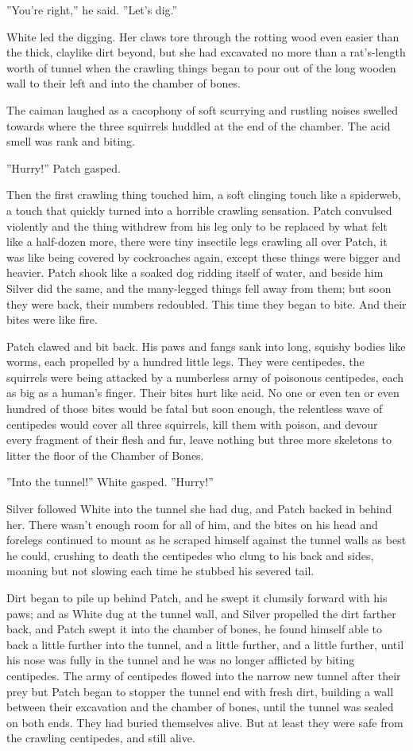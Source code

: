\documentclass[12pt]{book}
\begin{document}
''You're right,'' he said. ''Let's dig.''

White led the digging. Her claws tore through the rotting wood even easier than the thick, claylike dirt beyond, but she had excavated no more than a rat's-length worth of tunnel when the crawling things began to pour out of the long wooden wall to their left and into the chamber of bones.

The caiman laughed as a cacophony of soft scurrying and rustling noises swelled towards where the three squirrels huddled at the end of the chamber. The acid smell was rank and biting.

''Hurry!'' Patch gasped.

Then the first crawling thing touched him, a soft clinging touch like a spiderweb, a touch that quickly turned into a horrible crawling sensation. Patch convulsed violently and the thing withdrew from his leg %
only to be replaced by what felt like a half-dozen more, there were tiny insectile legs crawling all over Patch, it was like being covered by cockroaches again, except these things were bigger and heavier. Patch shook like a soaked dog ridding itself of water, and beside him Silver did the same, and the many-legged things fell away from them; but soon they were back, their numbers redoubled. This time they began to bite. And their bites were like fire.

Patch clawed and bit back. His paws and fangs sank into long, squishy bodies like worms, each propelled by a hundred little legs. They were centipedes, the squirrels were being attacked by a numberless army of poisonous centipedes, each as big as a human's finger. Their bites hurt like acid. No one or even ten or even hundred of those bites would be fatal %
but soon enough, the relentless wave of centipedes would cover all three squirrels, kill them with poison, and devour every fragment of their flesh and fur, leave nothing but three more skeletons to litter the floor of the Chamber of Bones.

''Into the tunnel!'' White gasped. ''Hurry!''

Silver followed White into the tunnel she had dug, and Patch backed in behind her. There wasn't enough room for all of him, and the bites on his head and forelegs continued to mount as he scraped himself against the tunnel walls as best he could, crushing to death the centipedes who clung to his back and sides, moaning but not slowing each time he stubbed his severed tail.

Dirt began to pile up behind Patch, and he swept it clumsily forward with his paws; and as White dug at the tunnel wall, and Silver propelled the dirt farther back, and Patch swept it into the chamber of bones, he found himself able to back a little further into the tunnel, and a little further, and a little further, until his nose was fully in the tunnel and he was no longer afflicted by biting centipedes. The army of centipedes flowed into the narrow new tunnel after their prey %
but Patch began to stopper the tunnel end with fresh dirt, building a wall between their excavation and the chamber of bones, until the tunnel was sealed on both ends. They had buried themselves alive. But at least they were safe from the crawling centipedes, and still alive.
\end{document}
